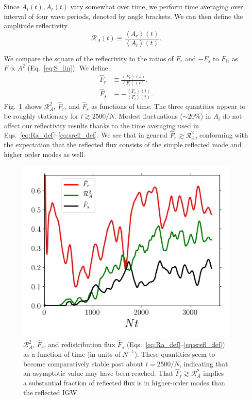 \documentclass[
        fleqn,
        usenatbib,
    ]{mnras}
\newcommand*{\ev}[1]{\left\langle#1\right\rangle}
\begin{document}
Since $A_i(t), A_r(t)$ vary somewhat over time, we perform time averaging over
interval of four wave periods, denoted by angle brackets. We can then define the
amplitude reflectivity
\begin{equation}
    \mathcal{R}_A(t) \equiv \frac{\ev{A_r}(t)}{\ev{A_i}(t)}
        .\label{eq:Ra_def}
\end{equation}

We compare the square of the reflectivity to the ratios of $F_r$ and $-F_s$ to
$F_i$, as $F \propto A^2$ (Eq.~\eqref{eq:S_lin}). We define
\begin{align}
    \hat{F}_r &\equiv \frac{\ev{F_r}(t)}{\ev{F_i}(t)}, \label{eq:srefl_def1}\\
    \hat{F}_s &\equiv -\frac{\ev{F_s}(t)}{\ev{F_i}(t)}. \label{eq:srefl_def}
\end{align}
Fig.~\ref{fig:nl_f_refl} shows $\mathcal{R}_A^2$, $\hat{F}_r$, and $\hat{F}_s$
as functions of time. The three quantities appear to be roughly stationary for
$t \gtrsim 2500/N$. Modest fluctuations ($\sim 20\%$) in $A_i$ do not affect our
reflectivity results thanks to the time averaging used in
Eqs.~\eqref{eq:Ra_def}--\eqref{eq:srefl_def}.%
We see that in general $\hat{F}_r \gtrsim \mathcal{R}_A^2$, conforming with the
expectation that the reflected flux consists of the simple reflected mode and
higher order modes as well.
\begin{figure}
    \centering
    \includegraphics[width=0.9\columnwidth]{plots/nl_f_refl.png}
    \caption{$\mathcal{R}_A^2$, $\hat{F}_r$, and redistribution flux $\hat{F}_s$
    (Eqs.~\eqref{eq:Ra_def}--\eqref{eq:srefl_def}) as a function of time (in
    units of $N^{-1}$). These quantities seem to become comparatively stable
    past about $t = 2500/N$, indicating that an asymptotic value may have been
    reached. That $\hat{F}_r \gtrsim \mathcal{R}_A^2$ implies a substantial
    fraction of reflected flux is in higher-order modes than the reflected
    IGW.}\label{fig:nl_f_refl}
\end{figure}
\end{document}
